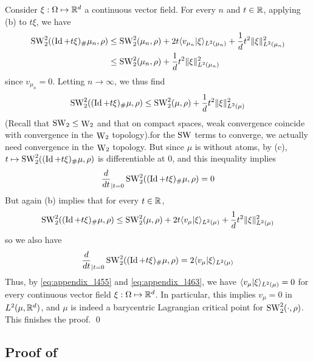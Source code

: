 Consider $\xi : \Omega \mapsto \mathbb R^d$ a continuous vector field. For every $n$ and $t \in \mathbb R$, applying (b) to $t\xi$, we have
\begin{align}
    \mathop{\mathrm{SW}}\nolimits^2_2((\mathop{\mathrm{Id}}\nolimits+t\xi)_\#\mu_n,\rho) &\leq \mathop{\mathrm{SW}}\nolimits^2_2(\mu_n, \rho) + 2t\langle v_{\mu_n}|\xi\rangle_{L^2(\mu_n)} + \frac 1d t^2 \|\xi\|^2_{L^2(\mu_n)} \\
    &\leq \mathop{\mathrm{SW}}\nolimits^2_2(\mu_n,\rho) + \frac 1d t^2 \|\xi\|^2_{L^2(\mu_n)}
\end{align}
since $v_{\mu_n} = 0$. Letting $n \rightarrow \infty$, we thus find
\begin{equation}
    \mathop{\mathrm{SW}}\nolimits_2^2((\mathop{\mathrm{Id}}\nolimits+t\xi)_\#\mu, \rho) \leq \mathop{\mathrm{SW}}\nolimits^2_2(\mu,\rho) + \frac 1d t^2 \|\xi\|^2_{L^2(\mu)}
\end{equation}
(Recall that $\mathop{\mathrm{SW}}\nolimits_2 \leq \mathop{\mathrm{W}}\nolimits_2$ and that on compact spaces, weak convergence coincide with convergence in the $\mathop{\mathrm{W}}\nolimits_2$ topology).for the $\mathop{\mathrm{SW}}\nolimits$ terms to converge, we actually need convergence in the $\mathop{\mathrm{W}}\nolimits_2$ topology. But since $\mu$ is without atoms, by (c), $t \mapsto \mathop{\mathrm{SW}}\nolimits^2_2((\mathop{\mathrm{Id}}\nolimits+t\xi)_\#\mu,\rho)$ is differentiable at 0, and this inequality implies
\begin{equation} \label{eq:appendix_l455}
    \frac{d}{dt}_{|t=0} \mathop{\mathrm{SW}}\nolimits^2_2((\mathop{\mathrm{Id}}\nolimits+t\xi)_\#\mu, \rho) = 0
\end{equation}
But again (b) implies that for every $t \in \mathbb R$,
\begin{equation}
    \mathop{\mathrm{SW}}\nolimits^2_2((\mathop{\mathrm{Id}}\nolimits+t\xi)_\#\mu,\rho) \leq \mathop{\mathrm{SW}}\nolimits^2_2(\mu, \rho) + 2t\langle v_{\mu}|\xi\rangle_{L^2(\mu)} + \frac 1d t^2 \|\xi\|^2_{L^2(\mu)}
\end{equation}
so we also have
\begin{equation} \label{eq:appendix_l463}
    \frac{d}{dt}_{|t=0} \mathop{\mathrm{SW}}\nolimits^2_2((\mathop{\mathrm{Id}}\nolimits+t\xi)_\#\mu, \rho) = 2\langle v_\mu|\xi\rangle_{L^2(\mu)}
\end{equation}
Thus, by \eqref{eq:appendix_l455} and \eqref{eq:appendix_l463}, we have $\langle v_\mu|\xi\rangle_{L^2(\mu)} = 0$ for every continuous vector field $\xi : \Omega \mapsto \mathbb R^d$. In particular, this implies $v_\mu = 0$ in $L^2(\mu,\mathbb R^d)$, and $\mu$ is indeed a barycentric Lagrangian critical point for $\mathop{\mathrm{SW}}\nolimits^2_2(\cdot,\rho)$. This finishes the proof. \qed

\subsection{Proof of \texorpdfstring{}{}}  \label{sec:prop_ex_symmetric_crit_points}

